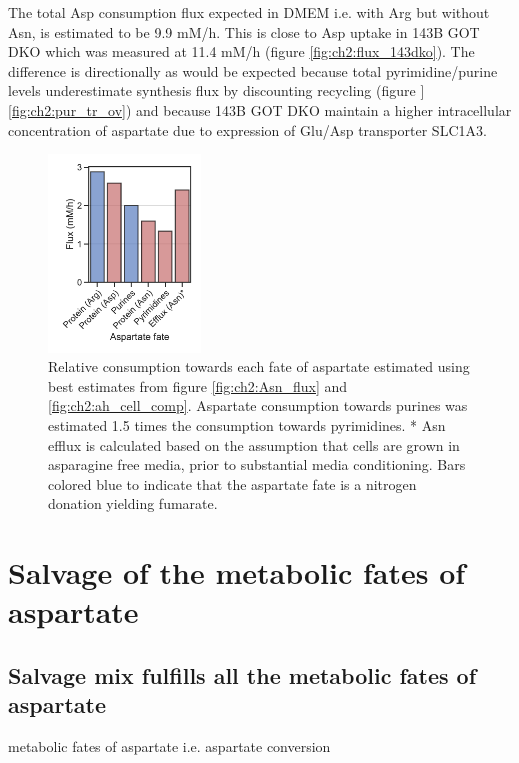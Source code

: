 The total Asp consumption flux expected in DMEM i.e. with Arg but without Asn, is estimated to be 9.9 mM/h.
This is close to Asp uptake in 143B GOT DKO which was measured at 11.4 mM/h (figure \ref{fig:ch2:flux_143dko}).
The difference is directionally as would be expected because total pyrimidine/purine levels underestimate synthesis flux by discounting recycling (figure ]\ref{fig:ch2:pur_tr_ov}) and because 143B GOT DKO maintain a higher intracellular concentration of aspartate due to expression of Glu/Asp transporter SLC1A3.
\begin{figure}
    \centering
    \includegraphics[width=0.36\textwidth]{figures/chap2/asp_fate.pdf}
    \caption[Relative consumption towards each fate of aspartate]{
    Relative consumption towards each fate of aspartate estimated using best estimates from figure \ref{fig:ch2:Asn_flux} and \ref{fig:ch2:ah_cell_comp}.
    Aspartate consumption towards purines was estimated 1.5 times the consumption towards pyrimidines.
    * Asn efflux is calculated based on the assumption that cells are grown in asparagine free media, prior to substantial media conditioning.
    Bars colored blue to indicate that the aspartate fate is a nitrogen donation yielding fumarate.
    }
    \label{fig:ch2:asp_fate}
\end{figure}






\section{Salvage of the metabolic fates of aspartate}

\subsection{Salvage mix fulfills all the metabolic fates of aspartate}

metabolic fates of aspartate i.e. aspartate conversion 


